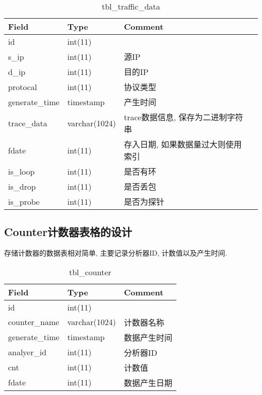 \begin{table}[]
    \centering
    \caption{tbl\_traffic\_data}
    \begin{tabular}{llll}   \hline
    Field          & Type          & Comment                   \\ \hline
    id             & int(11)       &                           \\
    s\_ip          & int(11)       & 源IP                       \\
    d\_ip          & int(11)       & 目的IP                      \\
    protocal       & int(11)       & 协议类型                      \\
    generate\_time & timestamp     & 产生时间                      \\
    trace\_data    & varchar(1024) & trace数据信息, 保存为二进制字符串    \\
    fdate          & int(11)       & 存入日期, 如果数据量过大则使用索引 \\
    is\_loop       & int(11)       & 是否有环                      \\
    is\_drop       & int(11)       & 是否丢包                      \\
    is\_probe      & int(11)       & 是否为探针                    \\ \hline
    \end{tabular}
    \label{tbl_traffic_data}
\end{table}



\subsection{Counter计数器表格的设计}

存储计数器的数据表相对简单, 主要记录分析器ID, 计数值以及产生时间.

\begin{table}[]
    \centering
    \caption{tbl\_counter}
    \label{tbl_counter}
    \begin{tabular}{lll} \hline
    Field          & Type          & Comment \\ \hline
    id             & int(11)       &         \\
    counter\_name  & varchar(1024) & 计数器名称   \\
    generate\_time & timestamp     & 数据产生时间  \\
    analyer\_id    & int(11)       & 分析器ID   \\
    cnt            & int(11)       & 计数值     \\
    fdate          & int(11)       & 数据产生日期  \\ \hline
    \end{tabular}
\end{table}

